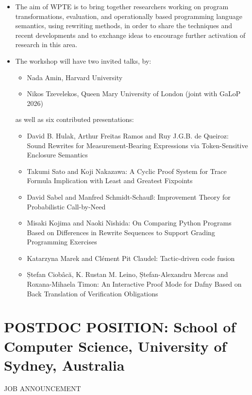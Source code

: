 \documentclass[prodmode,acmtecs]{acmsmall} %
\begin{document}
\begin{itemize}\item  The aim of WPTE is to bring together researchers working on program transformations, evaluation, and operationally based programming language semantics, using rewriting methods, in order to share the techniques and recent developments and to exchange ideas to encourage further activation of research in this area. 
 
\item  The workshop will have two invited talks, by: 
 
\begin{itemize}\item  Nada Amin, Harvard University
\item  Nikos Tzevelekos, Queen Mary University of London (joint with GaLoP 2026)
\end{itemize} 
  as well as six contributed presentations: 
 
\begin{itemize}\item  David B. Hulak, Arthur Freitas Ramos and Ruy J.G.B. de Queiroz: Sound Rewrites for Measurement-Bearing Expressions via Token-Sensitive Enclosure Semantics
\item  Takumi Sato and Koji Nakazawa: A Cyclic Proof System for Trace Formula Implication with Least and Greatest Fixpoints
\item  David Sabel and Manfred Schmidt-Schauß: Improvement Theory for Probabilistic Call-by-Need
\item  Misaki Kojima and Naoki Nishida: On Comparing Python Programs Based on Differences in Rewrite Sequences to Support Grading Programming Exercises
\item  Katarzyna Marek and Clément Pit Claudel: Tactic-driven code fusion
\item  Ștefan Ciobâcă, K. Rustan M. Leino, Ștefan-Alexandru Mercas and Roxana-Mihaela Timon: An Interactive Proof Mode for Dafny Based on Back Translation of Verification Obligations
\end{itemize} 
\end{itemize}\section{POSTDOC POSITION: School of Computer Science, University of Sydney, Australia}\label{POSTDOCPOSITION}JOB ANNOUNCEMENT 
\end{document}
